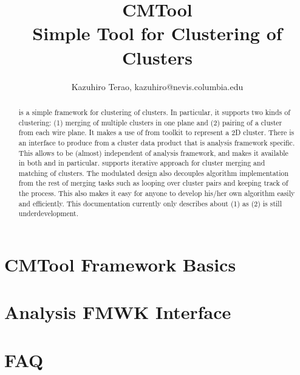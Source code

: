 \documentclass[a4paper,12pt]{report}
\begin{document}
\title{CMTool \\ \vspace{0.1in} Simple Tool for Clustering of Clusters}
\author{Kazuhiro Terao, kazuhiro@nevis.columbia.edu}
\maketitle

\begin{abstract}
{\cmtool} is a simple framework for clustering of clusters. In particular, it supports two kinds of clustering: (1) merging of multiple clusters in one plane and (2) pairing of a cluster from each wire plane. It makes a use of {\cpan} from {\cru} toolkit to represent a 2D cluster. There is an interface to produce {\cpan} from a cluster data product that is analysis framework specific. This allows {\cmtool} to be (almost) independent of analysis framework, and makes it available in both {\larsoft} and {\larlight} in particular. {\cmtool} supports iterative approach for cluster merging and matching of clusters. The modulated design also decouples algorithm implementation from the rest of merging tasks such as looping over cluster pairs and keeping track of the process. This also makes it easy for anyone to develop his/her own algorithm easily and efficiently. This documentation currently only describes about (1) as (2) is still underdevelopment. 
\end{abstract}

\tableofcontents

\newpage
\chapter{{\ttfamily CMTool} Framework Basics}
\label{chap:basics}


\chapter{Analysis FMWK Interface}
\label{chap:fmwk_interface}


\chapter{FAQ}
\label{chap:faq}





\end{document}

